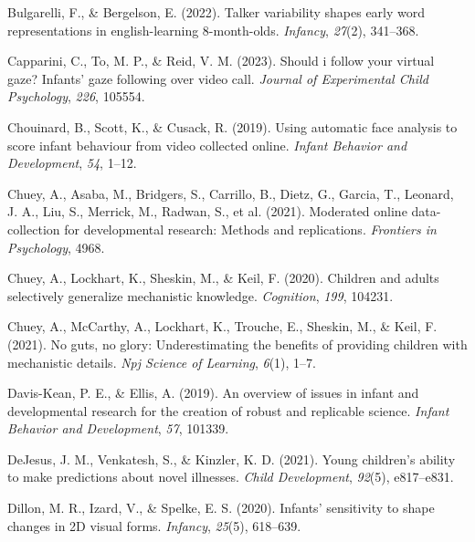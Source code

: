 \documentclass[
  man,floatsintext]{apa6}
\newlength{\cslhangindent}
\newlength{\cslentryspacingunit} %
\newenvironment{CSLReferences}[2] %
 {%
  \setlength{\parindent}{0pt}
  \ifodd #1
  \let\oldpar\par
  \def\par{\hangindent=\cslhangindent\oldpar}
  \fi
  \setlength{\parskip}{#2\cslentryspacingunit}
 }%
 {}
\begin{document}
\begin{CSLReferences}{1}{0}
\leavevmode{}%
Bulgarelli, F., \& Bergelson, E. (2022). Talker variability shapes early word representations in english-learning 8-month-olds. \emph{Infancy}, \emph{27}(2), 341--368.

\leavevmode{}%
Capparini, C., To, M. P., \& Reid, V. M. (2023). Should i follow your virtual gaze? Infants' gaze following over video call. \emph{Journal of Experimental Child Psychology}, \emph{226}, 105554.

\leavevmode{}%
Chouinard, B., Scott, K., \& Cusack, R. (2019). Using automatic face analysis to score infant behaviour from video collected online. \emph{Infant Behavior and Development}, \emph{54}, 1--12.

\leavevmode{}%
Chuey, A., Asaba, M., Bridgers, S., Carrillo, B., Dietz, G., Garcia, T., Leonard, J. A., Liu, S., Merrick, M., Radwan, S., et al. (2021). Moderated online data-collection for developmental research: Methods and replications. \emph{Frontiers in Psychology}, 4968.

\leavevmode{}%
Chuey, A., Lockhart, K., Sheskin, M., \& Keil, F. (2020). Children and adults selectively generalize mechanistic knowledge. \emph{Cognition}, \emph{199}, 104231.

\leavevmode{}%
Chuey, A., McCarthy, A., Lockhart, K., Trouche, E., Sheskin, M., \& Keil, F. (2021). No guts, no glory: Underestimating the benefits of providing children with mechanistic details. \emph{Npj Science of Learning}, \emph{6}(1), 1--7.

\leavevmode{}%
Davis-Kean, P. E., \& Ellis, A. (2019). An overview of issues in infant and developmental research for the creation of robust and replicable science. \emph{Infant Behavior and Development}, \emph{57}, 101339.

\leavevmode{}%
DeJesus, J. M., Venkatesh, S., \& Kinzler, K. D. (2021). Young children's ability to make predictions about novel illnesses. \emph{Child Development}, \emph{92}(5), e817--e831.

\leavevmode{}%
Dillon, M. R., Izard, V., \& Spelke, E. S. (2020). Infants' sensitivity to shape changes in 2D visual forms. \emph{Infancy}, \emph{25}(5), 618--639.


\end{CSLReferences}
\end{document}

